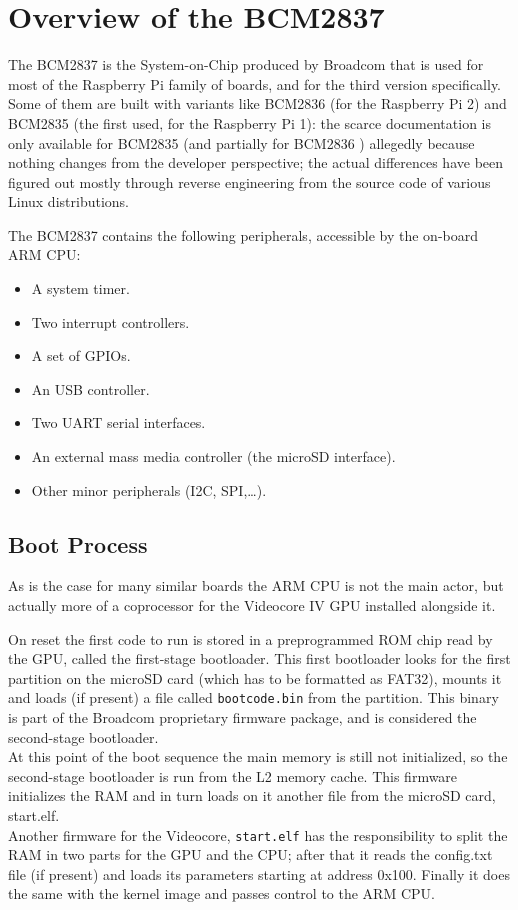 \documentclass[12pt,a4paper,openright,twoside]{report}
\begin{document}


\clearpage{\pagestyle{empty}\cleardoublepage}
\chapter{Overview of the BCM2837}
The BCM2837 is the System-on-Chip produced by Broadcom that is used for most
of the Raspberry Pi family of boards, and for the third version specifically.
 Some of them are built with variants like BCM2836 (for the Raspberry Pi 2)
  and BCM2835 (the first used, for the Raspberry Pi 1): the scarce documentation
  is only available for BCM2835 \cite{bcm2835} (and partially for BCM2836 \cite{rev3.4})
  allegedly because nothing changes from the developer perspective; the actual 
  differences have been figured out mostly through reverse engineering from the 
  source code of various Linux distributions.

The BCM2837 contains the following peripherals, accessible by the on-board ARM CPU:
\begin{itemize}
    \item A system timer.
    \item Two interrupt controllers.
    \item A set of GPIOs.
    \item An USB controller.
    \item Two UART serial interfaces.
    \item An external mass media controller (the microSD interface).
    \item Other minor peripherals (I2C, SPI,\ldots).
\end{itemize}

\section{Boot Process}
As is the case for many similar boards the ARM CPU is not the main
actor, but actually more of a coprocessor for the Videocore IV GPU installed
alongside it.

On reset the first code to run is stored in a preprogrammed ROM chip read by the GPU,
called the first-stage bootloader. This first bootloader looks for the first
partition on the microSD card (which has to be formatted as FAT32), mounts
it and loads (if present) a file called {\tt bootcode.bin} from the partition.
This binary is part of the Broadcom proprietary firmware package, and is considered
the second-stage bootloader.\\
At this point of the boot sequence the main memory is still not initialized, so the second-stage
bootloader is run from the L2 memory cache. This firmware initializes the RAM 
and in turn loads on it another file from the microSD card, start.elf.\\
Another firmware for the Videocore, {\tt start.elf} has the responsibility to split 
the RAM in two parts for the GPU and the CPU; after that it reads the config.txt 
file (if present) and loads its parameters starting at address 0x100.
 Finally it does the same with the kernel image and passes control to the ARM CPU.
\end{document}
